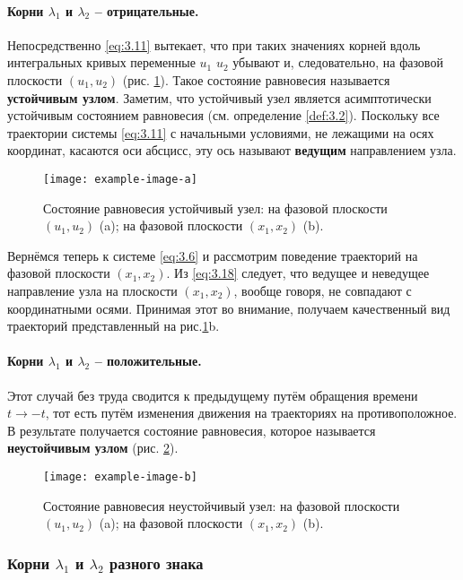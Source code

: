 \paragraph{Корни $\lambda_1$ и $\lambda_2$ -- отрицательные.}%
\label{par:korni_lambda_1_i_lambda_2_otritsatel_nye_}

Непосредственно \eqref{eq:3.11} вытекает, что при таких значениях корней вдоль интегральных кривых переменные $u_1$ $u_2$ убывают и, следовательно, на фазовой плоскости $(u_1,u_2)$ (рис. \ref{fig:3.3}). Такое состояние равновесия называется \textbf{ устойчивым узлом}. Заметим, что устойчивый узел является асимптотически устойчивым состоянием равновесия (см. определение \ref{def:3.2}). Поскольку все траектории системы \eqref{eq:3.11} с начальными условиями, не лежащими на осях координат, касаются оси абсцисс, эту ось называют \textbf{ ведущим} направлением узла.
\begin{figure}[h!]
        \centering
        \texttt{[image: example-image-a]}
        \caption{Состояние равновесия устойчивый узел: на фазовой плоскости $( u_1,u_2)$ (a); на фазовой плоскости $(x_1,x_2)$ (b).}
        \label{fig:3.3}
\end{figure}
Вернёмся теперь к системе \eqref{eq:3.6} и рассмотрим поведение траекторий на фазовой плоскости $(x_1,x_2)$. Из \eqref{eq:3.18} следует, что ведущее и неведущее направление узла на плоскости $(x_1,x_2)$, вообще говоря, не совпадают с координатными осями. Принимая этот во внимание, получаем качественный вид траекторий представленный на рис.\ref{fig:3.3}b.

\paragraph{Корни $\lambda_1$ и $\lambda_2$ -- положительные.}%
\label{par:korni_lambda_1_i_lambda_2_polozhitel_nye_}

Этот случай без труда сводится к предыдущему путём обращения времени $t \to - t$, тот есть путём изменения движения на траекториях на противоположное. В результате получается состояние равновесия, которое называется 
\textbf{ неустойчивым узлом} (рис. \ref{fig:3.4}). 
\begin{figure}[h!]
        \centering
        \texttt{[image: example-image-b]}
        \caption{Состояние равновесия неустойчивый узел: на фазовой плоскости $(u_1,u_2)$ (a); на фазовой плоскости $(x_1,x_2)$ (b).}
        \label{fig:3.4}
\end{figure}
\subsubsection{Корни $\lambda_1$ и $\lambda_2$ разного знака}%
\label{ssub:korni_lambda_1_i_lambda_2_raznogo_znaka}

